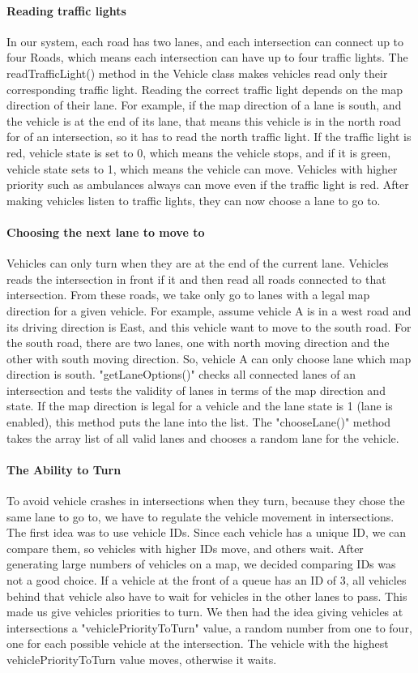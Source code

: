\documentclass[a4paper,11pt,titlepage]{article}
\begin{document}
\paragraph{Reading traffic lights}
In our system, each road has two lanes, and each intersection can connect up to four Roads, which means each intersection can have up to four traffic lights. The readTrafficLight() method in the Vehicle class makes vehicles read only their corresponding traffic light. Reading the correct traffic light depends on the map direction of their lane. For example, if the map direction of a lane is south, and the vehicle is at the end of its lane, that means this vehicle is in the north road for of an intersection, so it has to read the north traffic light. If the traffic light is red, vehicle state is set to 0, which means the vehicle stops, and if it is green, vehicle state sets to 1, which means the vehicle can move. Vehicles with higher priority such as ambulances always can move even if the traffic light is red. After making vehicles listen to traffic lights, they can now choose a lane to go to.
\paragraph{Choosing the next lane to move to} 
Vehicles can only turn when they are at the end of the current lane. Vehicles reads the intersection in front if it and then read all roads connected to that intersection. From these roads, we take only go to lanes with a legal map direction for a given vehicle. For example, assume vehicle A is in a west road and its driving direction is East, and this vehicle want to move to the south road. For the south road, there are two lanes, one with north moving direction and the other with south moving direction. So, vehicle A can only choose lane which map direction is south. 
"getLaneOptions()" checks all connected lanes of an intersection and tests the validity of lanes in terms of the map direction and state. If the map direction is legal for a vehicle and the lane state is 1 (lane is enabled), this method puts the lane into the list. 
The "chooseLane()" method takes the array list of all valid lanes and chooses a random lane for the vehicle.
\paragraph{The Ability to Turn}
To avoid vehicle crashes in intersections when they turn, because they chose the same lane to go to, we have to regulate the vehicle movement in intersections. The first idea was to use vehicle IDs. Since each vehicle has a unique ID, we can compare them, so vehicles with higher IDs move, and others wait. After generating large numbers of vehicles on a map, we decided comparing IDs was not a good choice. If a vehicle at the front of a queue has an ID of 3, all vehicles behind that vehicle also have to wait for vehicles in the other lanes to pass. This made us give vehicles priorities to turn. We then had the idea giving vehicles at intersections a "vehiclePriorityToTurn" value, a random number from one to four, one for each possible vehicle at the intersection. The vehicle with the highest vehiclePriorityToTurn value moves, otherwise it waits.
\end{document}
